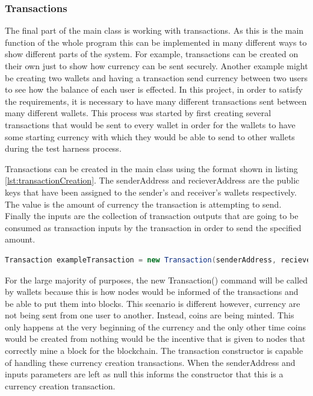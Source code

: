 \documentclass{l4proj}
\begin{document}
\subsubsection{Transactions}
The final part of the main class is working with transactions. As this is the main function of the whole program
this can be implemented in many different ways to show different parts of the system. For example, transactions
can be created on their own just to show how currency can be sent securely. Another example might be creating two
wallets and having a transaction send currency between two users to see how the balance of each user is effected.
In this project, in order to satisfy the requirements, it is necessary to have many different transactions sent
between many different wallets. This process was started by first creating several transactions that would
be sent to every wallet in order for the wallets to have some starting currency with which they would be able to
send to other wallets during the test harness process. 

Transactions can be created in the main class using the
format shown in listing \ref{lst:transactionCreation}. The senderAddress and recieverAddress are the public keys
that have been assigned to the sender's and receiver's wallets respectively. The value is the amount of currency the
transaction is attempting to send. Finally the inputs are the collection of transaction outputs that are going
to be consumed as transaction inputs by the transaction in order to send the specified amount.

\begin{lstlisting}[language=java, float=h, caption={This code snippet shows how transactions are created using
    the address of the sender, the address of the receiver, the value of the transaction, and the transaction
    inputs that are to be consumed by the transaction.}, label=lst:transactionCreation]
    Transaction exampleTransaction = new Transaction(senderAddress, recieverAddress, value, inputs);
\end{lstlisting}

For the large majority of purposes, the new Transaction() command will be called by wallets because this is how nodes
would be informed of the transactions and be able to put them into blocks. This scenario is different however, currency
are not being sent from one user to another. Instead, coins are being minted. This only happens at the very beginning
of the currency and the only other time coins would be created from nothing would be the incentive that is given
to nodes that correctly mine a block for the blockchain. The transaction constructor is capable of handling these
currency creation transactions. When the senderAddress and inputs parameters are left as null this informs the 
constructor that this is a currency creation transaction.
\end{document}
